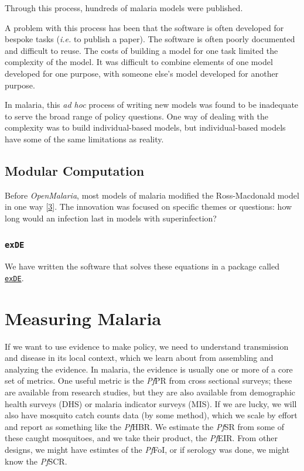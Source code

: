 \documentclass[
]{book}
\begin{document}
Through this process, hundreds of malaria models were published.

A problem with this process has been that the software is often developed for bespoke tasks (\emph{i.e.} to publish a paper). The software is often poorly documented and difficult to reuse. The costs of building a model for one task limited the complexity of the model. It was difficult to combine elements of one model developed for one purpose, with someone else's model developed for another purpose.

In malaria, this \emph{ad hoc} process of writing new models was found to be inadequate to serve the broad range of policy questions. One way of dealing with the complexity was to build individual-based models, but individual-based models have some of the same limitations as reality.

\hypertarget{modular-computation}{%
\section{Modular Computation}\label{modular-computation}}

Before \emph{OpenMalaria}, most models of malaria modified the Ross-Macdonald model in one way {[}\protect\hyperlink{ref-ReinerRC2013SystematicReview}{3}{]}. The innovation was focused on specific themes or questions: how long would an infection last in models with superinfection?

\hypertarget{exde}{%
\subsection{\texorpdfstring{\texttt{exDE}}{exDE}}\label{exde}}

We have written the software that solves these equations in a package called \href{https://cran.r-project.org/web/packages/exDE/index.html}{\texttt{exDE}}.

\hypertarget{measuring-malaria}{%
\chapter{Measuring Malaria}\label{measuring-malaria}}

If we want to use evidence to make policy, we need to understand transmission and disease in its local context, which we learn about from assembling and analyzing the evidence. In malaria, the evidence is usually one or more of a core set of metrics. One useful metric is the \emph{Pf}PR from cross sectional surveys; these are available from research studies, but they are also available from demographic health surveys (DHS) or malaria indicator surveys (MIS). If we are lucky, we will also have mosquito catch counts data (by some method), which we scale by effort and report as something like the \emph{Pf}HBR. We estimate the \emph{Pf}SR from some of these caught mosquitoes, and we take their product, the \emph{Pf}EIR. From other designs, we might have estimtes of the \emph{Pf}FoI, or if serology was done, we might know the \emph{Pf}SCR.
\end{document}

